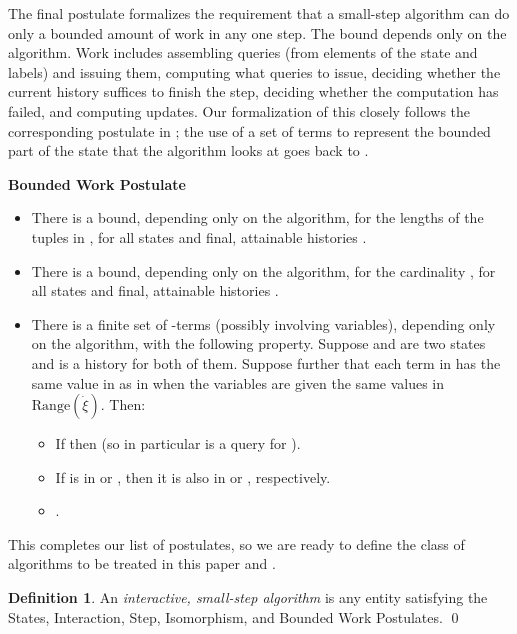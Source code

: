 \documentclass{LMCS}
\theoremstyle{definition}
\newtheorem{df}[thm]{Definition}
\newenvironment{ls}{\begin{itemize}}{\end{itemize}}
\newenvironment{unn}[1]{\bigskip\noindent\textbf{#1}\quad}{\par\bigskip}
\newcommand{\ans}{\dot}
\newcommand{\ran}[1]{\ensuremath{{\text{Range}}(#1)}}
\begin{document}
The final postulate formalizes the requirement that a small-step
algorithm can do only a bounded amount of work in any one step.  The
bound depends only on the algorithm.  Work includes assembling queries
(from elements of the state and labels) and issuing them, computing
what queries to issue, deciding whether the current history suffices
to finish the step, deciding whether the computation has failed, and
computing updates.  Our formalization of this closely follows the
corresponding postulate in \cite[Section~5]{oa1}; the use of a set of
terms to represent the bounded part of the state that the algorithm
looks at goes back to \cite{seqth}.

\begin{unn}{Bounded Work Postulate}
\mbox{}
  \begin{ls}
    \item There is a bound, depending only on the algorithm, for the
    lengths of the tuples in  , for all states  and
    final, attainable histories .
    \item There is a bound, depending only on the algorithm, for the
    cardinality , for all states  and final,
    attainable histories .
    \item There is a finite set  of -terms (possibly
    involving variables), depending only on the algorithm, with the
    following property.  Suppose  and  are two states and 
    is a history for both of them.  Suppose further that each term in
     has the same value in  as in  when the variables are
    given the same values in \ran{\ans\xi}.  Then:
    \begin{ls}
      \item If  then  (so in particular
       is a query for ).
      \item If  is in  or , then it is
      also in  or , respectively.
      \item .
    \end{ls}
  \end{ls}
\end{unn}

This completes our list of postulates, so we are ready to define the
class of algorithms to be treated in this paper and \cite{ga2}.

\begin{df}   \label{alg-def}
  An \emph{interactive, small-step algorithm} is any entity satisfying
  the States, Interaction, Step, Isomorphism, and Bounded Work
  Postulates.
\qed\end{df}
\end{document}
